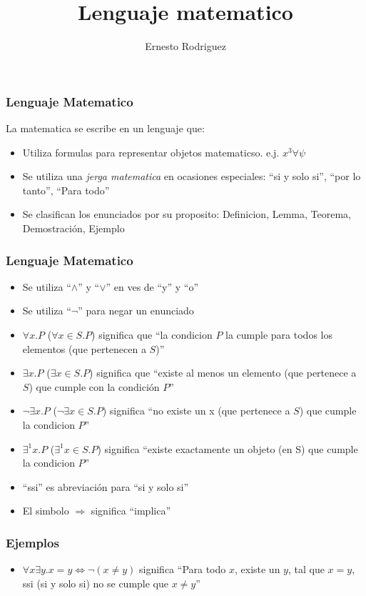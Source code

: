 \documentclass{beamer}
\title[Matematica]{Lenguaje matematico}
\author{Ernesto Rodriguez}
\institute{
    Universidad del Itsmo \\
    \medskip \textit{erodriguez@unis.edu.gt}
}
\date[\today]{}
\begin{document}
\begin{frame}
\frametitle{Lenguaje Matematico}
La matematica se escribe en un lenguaje que:
\begin{itemize}
    \item{Utiliza formulas para representar objetos matematicso.
    e.j. $x^3\forall \psi$}
    \item{Se utiliza una \emph{jerga matematica} en ocasiones
    especiales: ``si y solo si'', ``por lo tanto'', ``Para todo''}
    \item{Se clasifican los enunciados por su proposito: Definicion,
    Lemma, Teorema, Demostraci\'on, Ejemplo}
\end{itemize}
\end{frame}

\begin{frame}
\frametitle{Lenguaje Matematico}
\begin{itemize}
    \item{Se utiliza ``$\wedge$'' y ``$\vee$'' en ves de
    ``y'' y ``o''}
    \item{Se utiliza ``$\neg$'' para negar un enunciado}
    \item{$\forall x.P$ ($\forall x\in S.P$) significa que ``la condicion $P$ la cumple
    para todos los elementos (que pertenecen a $S$)''}
    \item{$\exists x.P$ ($\exists x\in S.P$) significa que ``existe
    al menos un elemento (que pertenece a $S$) que cumple con la condici\'on
    $P$''}
    \item{$\neg\exists x.P$ ($\neg\exists x\in S.P$) significa ``no
    existe un x (que pertenece a $S$) que cumple la condicion $P$''}
    \item{$\exists^{1} x.P$ ($\exists^{1} x \in S.P$) significa ``existe exactamente
    un objeto (en S) que cumple la condicion $P$''}
    \item{``ssi'' es abreviaci\'on para ``si y solo si''}
    \item{El simbolo $\Rightarrow$ significa ``implica''}
\end{itemize}
\end{frame}

\begin{frame}
\frametitle{Ejemplos}

\begin{itemize}
    \item{$\forall x\exists y.x=y \Leftrightarrow \neg(x\neq y)$ significa
    ``Para todo $x$, existe un $y$, tal que $x=y$, ssi (si y solo
    si) no se cumple que $x\neq y$''}
\end{itemize}

\end{frame}
\end{document}
